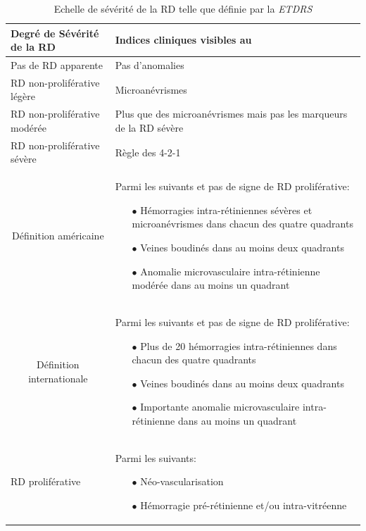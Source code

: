 \begin{table}
	\centering
	\caption{Echelle de sévérité de la \ac{RD} telle que définie par la \textit{\ac{ETDRS}}}
	\label{tab:ETDRS}
	\begin{tabular}{p{}p{}} 
		\toprule
		Degré de Sévérité  de la \ac{RD} & Indices cliniques visibles au \fundus\\ 
		\toprule
		\rowcolor[gray]{0.95} Pas de \ac{RD} apparente & Pas d'anomalies\\ 
		\ac{RD} non-proliférative légère & Microanévrismes\\
		\rowcolor[gray]{0.95} \ac{RD} non-proliférative modérée & Plus que des microanévrismes mais pas les marqueurs de la \ac{RD} sévère\\ 
		\ac{RD} non-proliférative sévère & Règle des 4-2-1  \\
		\multicolumn{1}{c}{Définition américaine}   & Parmi les suivants et pas de signe de \ac{RD} proliférative:
		\begin{itemize}
			\item[$\bullet$] Hémorragies intra-rétiniennes sévères et microanévrismes dans chacun des quatre quadrants
			\item [$\bullet$] Veines boudinés dans au moins deux quadrants
			\item[$\bullet$]  Anomalie microvasculaire intra-rétinienne modérée dans au moins un quadrant
		\end{itemize}
		\\	\cmidrule{2-2}
		\multicolumn{1}{c}{Définition internationale}   & Parmi les suivants et pas de signe de \ac{RD} proliférative:
		\begin{itemize}
			\item[$\bullet$] Plus de 20 hémorragies intra-rétiniennes  dans chacun des quatre quadrants
			\item [$\bullet$] Veines boudinés dans au moins deux quadrants
			\item[$\bullet$] Importante anomalie microvasculaire intra-rétinienne dans au moins un quadrant
		\end{itemize}
		\\
		\rowcolor[gray]{0.95} \ac{RD} proliférative & Parmi les suivants:
		\begin{itemize}
			\item[$\bullet$] Néo-vascularisation
			\item [$\bullet$] Hémorragie pré-rétinienne et/ou intra-vitréenne 
			
		\end{itemize}
		\\
		\bottomrule
	\end{tabular}
	
\end{table}

